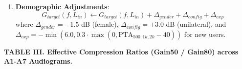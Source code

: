 \documentclass[
]{article}
\begin{document}
\begin{enumerate}
  \textbf{Piecewise Linear-Compressive Spline}: Gain at the compression
  threshold is: \begin{equation}
  G_{CT}(f) = \begin{cases} 
  G_{65}^{(4)}(f), & \text{if } \text{CT}_{band}(f) > P(f) \\ 
  G_{65}^{(4)}(f) + \left(P(f) - \text{CT}_{band}(f)\right)\left(1 - \frac{1}{\text{CR}_{loud}(f)}\right), & \text{if } \text{CT}_{band}(f) \le P(f) 
  \end{cases}
  \end{equation} The level-dependent WDRC target gain is:
  \begin{equation}
  G_{target}(f, L_{in}) = \begin{cases} 
  G_{CT}(f), & \text{if } L_{band}(f) \le \text{CT}_{band}(f) \\ 
  G_{CT}(f) - \left(L_{band}(f) - \text{CT}_{band}(f)\right)\left(1 - \frac{1}{\text{CR}_{loud}(f)}\right), & \text{if } L_{band}(f) > \text{CT}_{band}(f) 
  \end{cases}
  \end{equation}
\item
  \textbf{Demographic Adjustments}: \begin{equation}
  G_{target}(f, L_{in}) \leftarrow G_{target}(f, L_{in}) + \Delta_{gender} + \Delta_{config} + \Delta_{exp}
  \end{equation} where \(\Delta_{gender} = -1.5\) dB (female),
  \(\Delta_{config} = +3.0\) dB (unilateral), and
  \(\Delta_{exp} = -\min\left(6.0, 0.3 \cdot \max\left(0, \text{PTA}_{500,1k,2k} - 40\right)\right)\)
  for new users.
\end{enumerate}

\textbf{TABLE III. Effective Compression Ratios (Gain50 / Gain80) across
A1-A7 Audiograms.}
\end{document}
